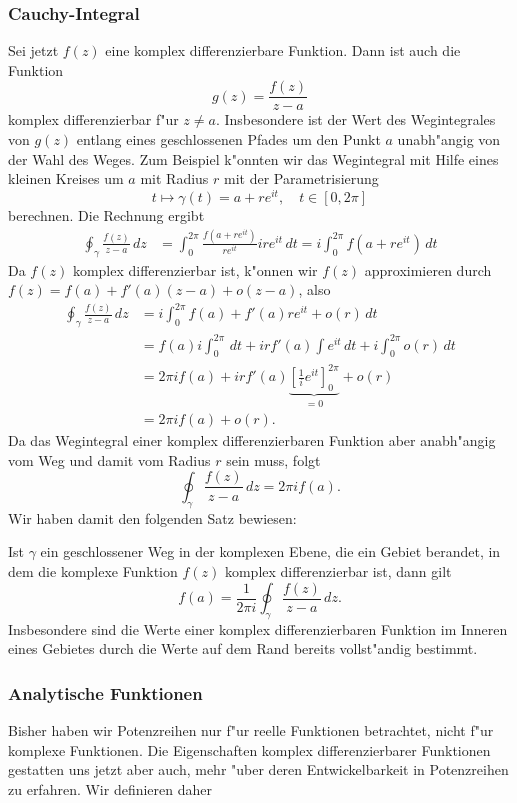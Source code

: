 
\subsubsection{Cauchy-Integral}
Sei jetzt $f(z)$ eine komplex differenzierbare Funktion.
Dann ist auch die Funktion
\[
g(z)=\frac{f(z)}{z-a}
\]
komplex differenzierbar f"ur $z\ne a$.
Insbesondere ist der Wert des Wegintegrales von $g(z)$ entlang
eines geschlossenen Pfades um den Punkt $a$ unabh"angig von der Wahl
des Weges.
Zum Beispiel k"onnten wir das Wegintegral mit Hilfe eines kleinen Kreises
um $a$ mit Radius $r$ mit der Parametrisierung
\[
t\mapsto \gamma(t)=a+re^{it},\quad t\in[0,2\pi]
\]
berechnen.
Die Rechnung ergibt
\begin{align*}
\oint_\gamma \frac{f(z)}{z-a}\,dz
&=
\int_0^{2\pi} \frac{f(a+re^{it})}{re^{it}}ire^{it}\,dt
=
i\int_0^{2\pi} f(a+re^{it})\,dt
\end{align*}
Da $f(z)$ komplex differenzierbar ist, k"onnen wir $f(z)$ approximieren
durch $f(z)=f(a)+f'(a)(z-a)+o(z-a)$, also
\begin{align*}
\oint_{\gamma} \frac{f(z)}{z-a}\,dz
&=
i\int_0^{2\pi}f(a) + f'(a)re^{it}+o(r)\,dt
\\
&=
f(a)i\int_0^{2\pi}\,dt + irf'(a)\int e^{it}\,dt + i\int_0^{2\pi}o(r)\,dt
\\
&=
2\pi i f(a) + irf'(a)\underbrace{\left[\frac1{i}e^{it}\right]_0^{2\pi}}_{=0}+o(r)
\\
&=2\pi i f(a)+o(r).
\end{align*}
Da das Wegintegral einer komplex differenzierbaren Funktion aber anabh"angig
vom Weg und damit vom Radius $r$ sein muss, folgt
\[
\oint_\gamma \frac{f(z)}{z-a}\,dz=2\pi i f(a).
\]
Wir haben damit den folgenden Satz bewiesen:

\begin{satz}[Cauchy]
Ist $\gamma$ ein geschlossener Weg in der komplexen Ebene, die ein
Gebiet berandet, in dem die komplexe Funktion $f(z)$ komplex
differenzierbar ist, dann gilt
\[
f(a)=\frac{1}{2\pi i}\oint_{\gamma}\frac{f(z)}{z-a}\,dz.
\]
Insbesondere sind die Werte einer komplex differenzierbaren Funktion 
im Inneren eines Gebietes durch die Werte auf dem Rand bereits vollst"andig
bestimmt.
\end{satz}

\subsubsection{Analytische Funktionen}
Bisher haben wir Potenzreihen nur f"ur reelle Funktionen betrachtet,
nicht f"ur komplexe Funktionen.
Die Eigenschaften komplex differenzierbarer Funktionen gestatten
uns jetzt aber auch, mehr "uber deren Entwickelbarkeit in Potenzreihen
zu erfahren.
Wir definieren daher

